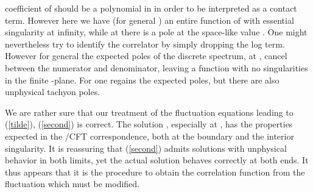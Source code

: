 \documentclass[a4paper,12pt]{article}
\def\mt{\tilde{m}}
\begin{document}
coefficient of \coordHE{} should be a polynomial in \coordHE{} in order to be
interpreted as a contact term.  However here we have (for general
\coordHE{}) an entire function of \coordHE{} with essential singularity at
infinity, while at \coordHE{} there is a pole at the space-like value
\coordHE{}.  One might nevertheless try to identify the correlator
by simply dropping the log term.  However for general \coordHE{} the
expected poles of the discrete spectrum, at \coordHE{}, cancel
between the numerator and denominator, leaving a function with no
singularities in the finite \coordHE{}-plane.  For \coordHE{} one regains the
expected poles, but there are also unphysical tachyon poles.

We are rather sure that our treatment of the fluctuation equations
leading to (\ref{tilde}), (\ref{second}) is correct.  The solution
\myHighlight{$\mt(u,p)$}\coordHE{}, especially at \coordHE{}, has the properties expected in the
\coordHE{}/CFT correspondence, both at the boundary and the interior
singularity.  It is reassuring that (\ref{second}) admits solutions
with unphysical behavior in both limits, yet the actual solution
\myHighlight{$\mt(r,p)$}\coordHE{} behaves correctly at both ends. It thus appears that it is
the procedure to obtain the correlation function from the fluctuation
which must be modified.
\end{document}
